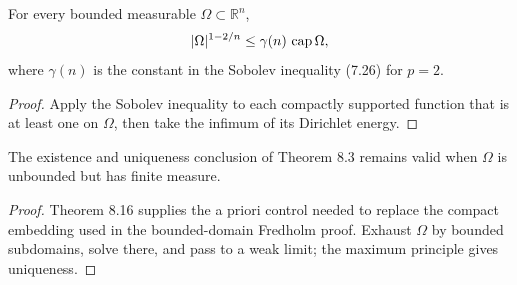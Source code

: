 \begin{lemma}
\label{gt-lem-8-capacity-measure}
For every bounded measurable $\Omega\subset\mathbb R^n$,
\[
|\Omega|^{1-2/n}\leq\gamma(n)\,\operatorname{cap}\Omega,
\]
where $\gamma(n)$ is the constant in the Sobolev inequality (7.26) for $p=2$.
\end{lemma}
\begin{proof}
\sketch Apply the Sobolev inequality to each compactly supported function that
is at least one on $\Omega$, then take the infimum of its Dirichlet energy.
\end{proof}

\begin{theorem}
\label{gt-thm-8-finite-measure-unbounded-dirichlet}
The existence and uniqueness conclusion of Theorem 8.3 remains valid when
$\Omega$ is unbounded but has finite measure.
\end{theorem}
\begin{proof}
\sketch Theorem 8.16 supplies the a priori control needed to replace the compact
embedding used in the bounded-domain Fredholm proof. Exhaust $\Omega$ by
bounded subdomains, solve there, and pass to a weak limit; the maximum principle
gives uniqueness.
\end{proof}
